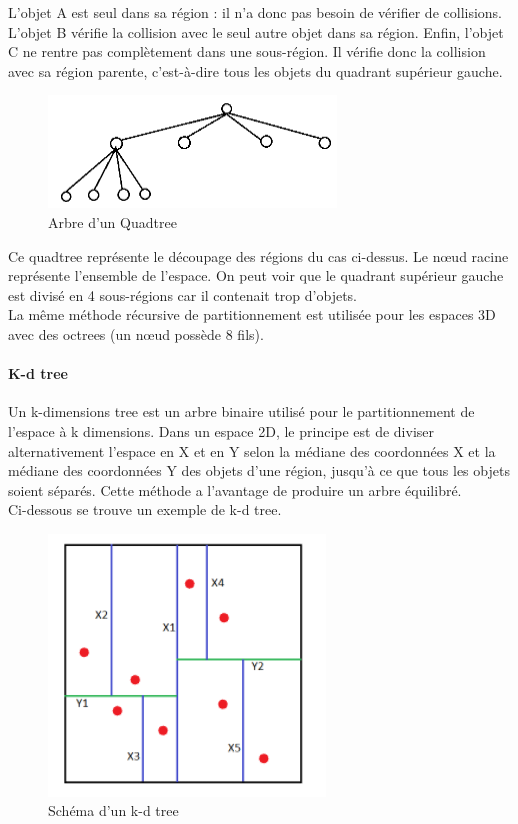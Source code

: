 \documentclass{report}
\begin{document}
L’objet A est seul dans sa région : il n’a donc pas besoin de vérifier de collisions. L’objet B vérifie la collision avec le seul autre objet dans sa région. Enfin, l’objet C ne rentre pas complètement dans une sous-région. Il vérifie donc la collision avec sa région parente, c’est-à-dire tous les objets du quadrant supérieur gauche.

\begin{figure}[H]
\centering
\includegraphics[scale=0.6]{arbre_quadtree.PNG}
\caption{Arbre d'un Quadtree}
\end{figure}

Ce quadtree représente le découpage des régions du cas ci-dessus. Le nœud racine représente l’ensemble de l’espace. On peut voir que le quadrant supérieur gauche est divisé en 4 sous-régions car il contenait trop d’objets. \\

La même méthode récursive de partitionnement est utilisée pour les espaces 3D avec des octrees (un nœud possède 8 fils).

\paragraph{K-d tree}

Un k-dimensions tree est un arbre binaire utilisé pour le partitionnement de l’espace à k dimensions. Dans un espace 2D, le principe est de diviser alternativement l’espace en X et en Y selon la médiane des coordonnées X et la médiane des coordonnées Y des objets d’une région, jusqu’à ce que tous les objets soient séparés. Cette méthode a l’avantage de produire un arbre équilibré. \\

Ci-dessous se trouve un exemple de k-d tree.

\begin{figure}[H]
\centering
\includegraphics[scale=0.6]{kdtree.png}
\caption{Schéma d'un k-d tree}
\end{figure}
\end{document}
